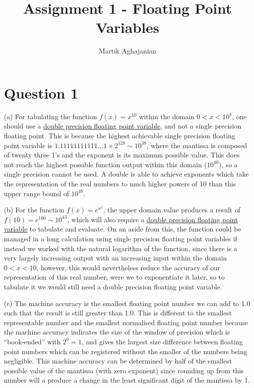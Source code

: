 \documentclass{article}
\title{Assignment 1 - Floating Point Variables}
\author{Martik Aghajanian}
\date{}
\begin{document}
\maketitle
\section{Question 1}

(a) For tabulating the function $f(x)=x^{10}$ within the domain $0<x<10^4$, one should use a \underline{double precision floating point variable}, and not a single precision floating point. This is because the highest achievable single precision floating point variable is $1.11111111111...1\times{2^{128}}\sim{10^{38}}$, where the mantissa is composed of twenty three 1's and the exponent is its maximum possible value. This does not reach the highest possible function output within this domain ($10^{40}$), so a single precision cannot be used. A double is able to achieve exponents which take the representation of the real numbers to much higher powers of 10 than this upper range bound of $10^{40}$.
\newline

\noindent (b) For the function $f(x)=e^{x^2}$, the upper domain value produces a result of $f(10)=e^{100}\sim{10^{43}}$, which will also require a \underline{double precision floating point variable} to tabulate and evaluate. On an aside from this, the function could be managed in a long calculation using single precision floating point variables if instead we worked with the natural logarithm of the function, since there is a very largely increasing output with an increasing input within the domain $0<x<10$, however, this would nevertheless reduce the accuracy of our representation of this real number, were we to exponentiate it later, so to tabulate it we would still need a double precision floating point variable.
\newline

\noindent (c) The machine accuracy is the smallest floating point number we can add to 1.0 such that the result is still greater than 1.0. This is different to the smallest representable number and the smallest normalised floating point number because the machine accuracy indicates the size of the window of precision which is “book-ended” with $2^0=1$, and gives the largest size difference between floating point numbers which can be registered without the smaller of the numbers being negligible. This machine accuracy can be determined by half of the smallest possible value of the mantissa (with zero exponent) since rounding up from this number will a produce a change in the least significant digit of the mantissa by 1.
\end{document}
